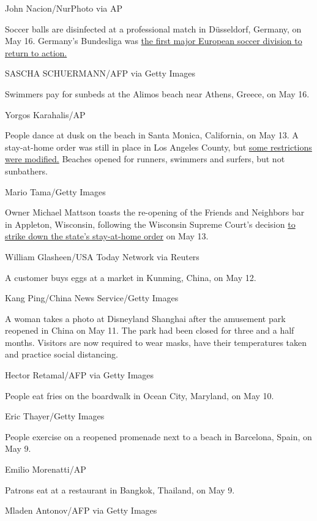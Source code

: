 John Nacion/NurPhoto via AP

Soccer balls are disinfected at a professional match in Düsseldorf,
Germany, on May 16. Germany's Bundesliga was
\href{https://www.cnn.com/2020/05/16/sport/germany-bundesliga-return-football-spt-intl/index.html}{the
first major European soccer division to return to action.}

SASCHA SCHUERMANN/AFP via Getty Images

Swimmers pay for sunbeds at the Alimos beach near Athens, Greece, on May
16.

Yorgos Karahalis/AP

People dance at dusk on the beach in Santa Monica, California, on May
13. A stay-at-home order was still in place in Los Angeles County, but
\href{https://www.cnn.com/2020/05/12/health/us-coronavirus-tuesday/index.html}{some
restrictions were modified.} Beaches opened for runners, swimmers and
surfers, but not sunbathers.

Mario Tama/Getty Images

Owner Michael Mattson toasts the re-opening of the Friends and Neighbors
bar in Appleton, Wisconsin, following the Wisconsin Supreme Court's
decision
\href{https://www.cnn.com/2020/05/13/politics/wisconsin-supreme-court-strikes-down-stay-at-home-order/index.html}{to
strike down the state's stay-at-home order} on May 13.

William Glasheen/USA Today Network via Reuters

A customer buys eggs at a market in Kunming, China, on May 12.

Kang Ping/China News Service/Getty Images

A woman takes a photo at Disneyland Shanghai after the amusement park
reopened in China on May 11. The park had been closed for three and a
half months. Visitors are now required to wear masks, have their
temperatures taken and practice social distancing.

Hector Retamal/AFP via Getty Images

People eat fries on the boardwalk in Ocean City, Maryland, on May 10.

Eric Thayer/Getty Images

People exercise on a reopened promenade next to a beach in Barcelona,
Spain, on May 9.

Emilio Morenatti/AP

Patrons eat at a restaurant in Bangkok, Thailand, on May 9.

Mladen Antonov/AFP via Getty Images

